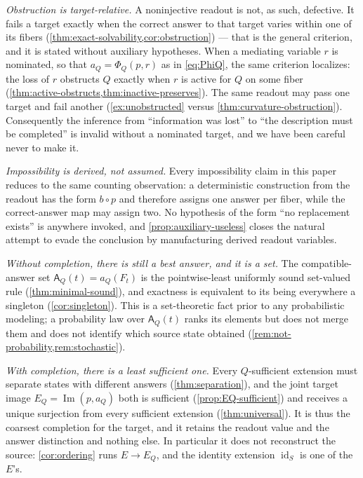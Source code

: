 \documentclass[11pt,reqno]{amsart}
\theoremstyle{plain}
\theoremstyle{definition}
\newcommand{\Src}{S}
\newcommand{\CompatSet}{\mathsf{A}}      %
\newcommand{\Img}{\operatorname{Im}}
\newcommand{\id}{\operatorname{id}}
\begin{document}
\emph{Obstruction is target-relative.} A noninjective readout is not, as such, defective. It fails
a target exactly when the correct answer to that target varies within one of its fibers
(\cref{thm:exact-solvability,cor:obstruction}) --- that is the general criterion, and it is stated
without auxiliary hypotheses. When a mediating variable $r$ is nominated, so that
$a_Q=\Phi_Q(p,r)$ as in \eqref{eq:PhiQ}, the same criterion localizes: the loss of $r$ obstructs
$Q$ exactly when $r$ is active for $Q$ on some fiber
(\cref{thm:active-obstructs,thm:inactive-preserves}). The same readout may pass one target and
fail another (\cref{ex:unobstructed} versus \cref{thm:curvature-obstruction}). Consequently the
inference from ``information was lost'' to ``the description must be completed'' is invalid
without a nominated target, and we have been careful never to make it.

\emph{Impossibility is derived, not assumed.} Every impossibility claim in this paper reduces to
the same counting observation: a deterministic construction from the readout has the form
$b\circ p$ and therefore assigns one answer per fiber, while the correct-answer map may assign
two. No hypothesis of the form ``no replacement exists'' is anywhere invoked, and
\cref{prop:auxiliary-useless} closes the natural attempt to evade the conclusion by manufacturing
derived readout variables.

\emph{Without completion, there is still a best answer, and it is a set.} The compatible-answer
set $\CompatSet_Q(t)=a_Q(F_t)$ is the pointwise-least uniformly sound set-valued rule
(\cref{thm:minimal-sound}), and exactness is equivalent to its being everywhere a singleton
(\cref{cor:singleton}). This is a set-theoretic fact prior to any probabilistic modeling; a
probability law over $\CompatSet_Q(t)$ ranks its elements but does not merge them and does not
identify which source state obtained (\cref{rem:not-probability,rem:stochastic}).

\emph{With completion, there is a least sufficient one.} Every $Q$-sufficient extension must
separate states with different answers (\cref{thm:separation}), and the joint target image
$E_Q=\Img(p,a_Q)$ both is sufficient (\cref{prop:EQ-sufficient}) and receives a unique surjection
from every sufficient extension (\cref{thm:universal}). It is thus the coarsest completion for the
target, and it retains the readout value and the answer distinction and nothing else. In
particular it does not reconstruct the source: \cref{cor:ordering} runs $E\to E_Q$, and the
identity extension $\id_\Src$ is one of the $E$'s.
\end{document}
